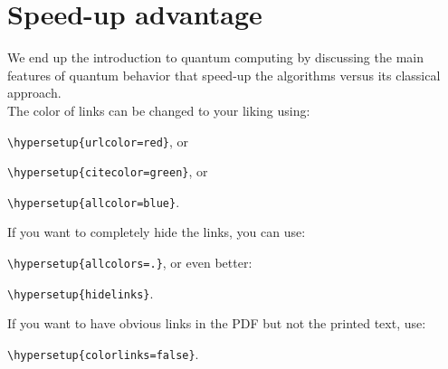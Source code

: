 \section{Speed-up advantage}
We end up the introduction to quantum computing by discussing the main features of quantum behavior that speed-up the algorithms versus its classical approach.\\

The color of links can be changed to your liking using:

{\small\verb!\hypersetup{urlcolor=red}!}, or

{\small\verb!\hypersetup{citecolor=green}!}, or

{\small\verb!\hypersetup{allcolor=blue}!}.

\noindent If you want to completely hide the links, you can use:

{\small\verb!\hypersetup{allcolors=.}!}, or even better: 

{\small\verb!\hypersetup{hidelinks}!}.

\noindent If you want to have obvious links in the PDF but not the printed text, use:

{\small\verb!\hypersetup{colorlinks=false}!}.
